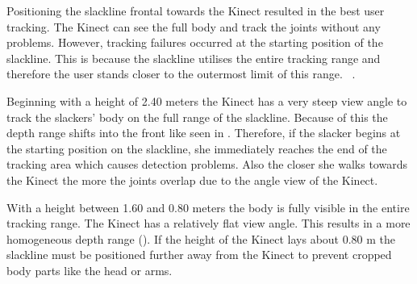 Positioning the slackline frontal towards the Kinect resulted in the best user tracking.
The Kinect can see the full body and track the joints without any problems.
However, tracking failures occurred at the starting position of the slackline. This is because the slackline utilises the entire tracking range and therefore the user stands closer to the outermost limit of this range.
~\textbf{}.


Beginning with a height of 2.40 meters the Kinect has a very steep view angle to track the slackers' body on the full range of the slackline. Because of this the depth range shifts into the front like seen in \textbf{}. Therefore, if the slacker begins at the starting position on the slackline, she immediately reaches the end of the tracking area which causes detection problems. Also the closer she walks towards the Kinect the more the joints overlap due to the angle view of the Kinect.

With a height between 1.60 and 0.80 meters the body is fully visible in the entire tracking range. The Kinect has a relatively flat view angle. This results in a more homogeneous depth range (\textbf{}).
If the height of the Kinect lays about 0.80 m the slackline must be positioned further away from the Kinect to prevent cropped body parts like the head or arms.


